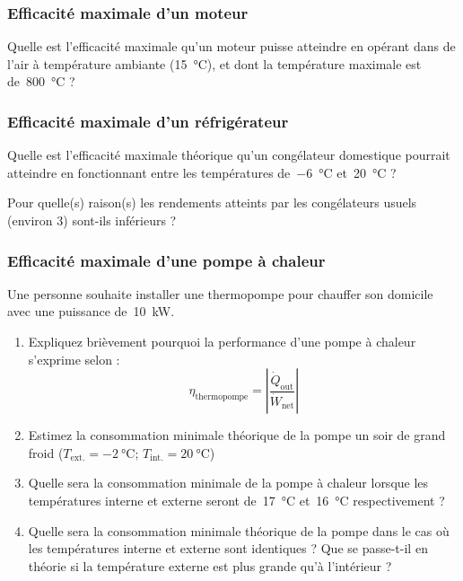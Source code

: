 \begin{boiboiboite}
	\propeau
	\propair
	\isentropiques
\end{boiboiboite}

\subsubsection{Efficacité maximale d’un moteur}

	Quelle est l’efficacité maximale qu’un moteur puisse atteindre en opérant dans de l’air à température ambiante (\SI{15}{\degreeCelsius}), et dont la température maximale est de~\SI{800}{\degreeCelsius} ?

\subsubsection{Efficacité maximale d’un réfrigérateur}

	Quelle est l’efficacité maximale théorique qu’un congélateur domestique pourrait atteindre en fonctionnant entre les températures de~\SI{-6}{\degreeCelsius} et~\SI{20}{\degreeCelsius} ?
	
	Pour quelle(s) raison(s) les rendements atteints par les congélateurs usuels (environ \num{3}) sont-ils inférieurs ?
	
\subsubsection{Efficacité maximale d’une pompe à chaleur}

	Une personne souhaite installer une thermopompe pour chauffer son domicile avec une puissance de~\SI{10}{\kilo\watt}.

	\begin{enumerate}
	
		\item Expliquez brièvement pourquoi la performance d’une pompe à chaleur s’exprime selon :
			\begin{equation}
				\eta_\text{thermopompe} = \left| \frac{\dot{Q}_\text{out}}{\dot{W}_\text{net}} \right|
			\end{equation}

		\item Estimez la consommation minimale théorique de la pompe un soir de grand froid ($T_\text{ext.} = \SI{-2}{\degreeCelsius}$; $T_\text{int.} = \SI{20}{\degreeCelsius}$)
		
		\item Quelle sera la consommation minimale de la pompe à chaleur lorsque les températures interne et externe seront de~\SI{17}{\degreeCelsius}  et~\SI{16}{\degreeCelsius} respectivement ? 
		
		\item Quelle sera la consommation minimale théorique de la pompe dans le cas où les températures interne et externe sont identiques ?  Que se passe-t-il en théorie si la température externe est plus grande qu’à l’intérieur ?

	\end{enumerate}


